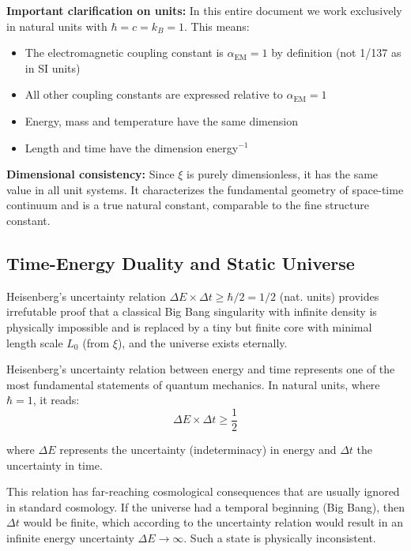 	\textbf{Important clarification on units:}
	In this entire document we work exclusively in natural units with $\hbar = c = k_B = 1$. This means:
	\begin{itemize}
		\item The electromagnetic coupling constant is $\alpha_{\text{EM}} = 1$ by definition (not 1/137 as in SI units)
		\item All other coupling constants are expressed relative to $\alpha_{\text{EM}} = 1$
		\item Energy, mass and temperature have the same dimension
		\item Length and time have the dimension energy$^{-1}$
	\end{itemize}
	
	\textbf{Dimensional consistency:} Since $\xi$ is purely dimensionless, it has the same value in all unit systems. It characterizes the fundamental geometry of space-time continuum and is a true natural constant, comparable to the fine structure constant.
	
	\subsection{Time-Energy Duality and Static Universe}
	
	\begin{important}
		Heisenberg's uncertainty relation $\Delta E \times \Delta t \geq \hbar/2 = 1/2$ (nat. units) provides irrefutable proof that a classical Big Bang singularity with infinite density is physically impossible and is replaced by a tiny but finite core with minimal length scale $L_0$ (from $\xi$), and the universe exists eternally.
	\end{important}
	
	Heisenberg's uncertainty relation between energy and time represents one of the most fundamental statements of quantum mechanics. In natural units, where $\hbar = 1$, it reads:
	\begin{equation}
		\Delta E \times \Delta t \geq \frac{1}{2}
	\end{equation}
	
	where $\Delta E$ represents the uncertainty (indeterminacy) in energy and $\Delta t$ the uncertainty in time.
	
	This relation has far-reaching cosmological consequences that are usually ignored in standard cosmology. If the universe had a temporal beginning (Big Bang), then $\Delta t$ would be finite, which according to the uncertainty relation would result in an infinite energy uncertainty $\Delta E \to \infty$. Such a state is physically inconsistent.
	
